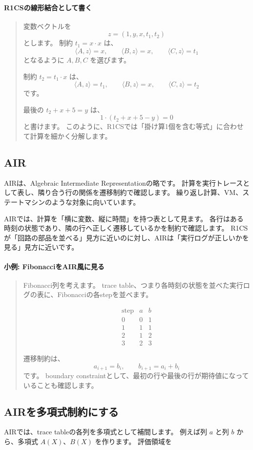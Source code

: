 \documentclass[a4paper,11pt]{ltjsarticle}
\newenvironment{examplebox}[1]{%
  \paragraph*{#1}\begin{quote}
}{%
  \end{quote}
}
\begin{document}
\begin{examplebox}{R1CSの線形結合として書く}
変数ベクトルを
\[
  z=(1,y,x,t_1,t_2)
\]
とします。
制約 \(t_1=x\cdot x\) は、
\[
  \langle A,z\rangle=x,\qquad
  \langle B,z\rangle=x,\qquad
  \langle C,z\rangle=t_1
\]
となるように \(A,B,C\) を選びます。

制約 \(t_2=t_1\cdot x\) は、
\[
  \langle A,z\rangle=t_1,\qquad
  \langle B,z\rangle=x,\qquad
  \langle C,z\rangle=t_2
\]
です。

最後の \(t_2+x+5=y\) は、
\[
  1\cdot(t_2+x+5-y)=0
\]
と書けます。
このように、R1CSでは「掛け算1個を含む等式」に合わせて計算を細かく分解します。
\end{examplebox}

\subsection{AIR}

AIRは、Algebraic Intermediate Representationの略です。
計算を実行トレースとして表し、隣り合う行の関係を遷移制約で確認します。
繰り返し計算、VM、ステートマシンのような対象に向いています。

AIRでは、計算を「横に変数、縦に時間」を持つ表として見ます。
各行はある時刻の状態であり、隣の行へ正しく遷移しているかを制約で確認します。
R1CSが「回路の部品を並べる」見方に近いのに対し、AIRは「実行ログが正しいかを見る」見方に近いです。

\begin{examplebox}{小例: FibonacciをAIR風に見る}
Fibonacci列を考えます。
trace table、つまり各時刻の状態を並べた実行ログの表に、Fibonacciの各stepを並べます。

\[
\begin{array}{c|cc}
\text{step} & a & b \\
\hline
0 & 0 & 1 \\
1 & 1 & 1 \\
2 & 1 & 2 \\
3 & 2 & 3
\end{array}
\]

遷移制約は、
\[
  a_{i+1}=b_i,\qquad b_{i+1}=a_i+b_i
\]
です。
boundary constraintとして、最初の行や最後の行が期待値になっていることも確認します。
\end{examplebox}

\subsection{AIRを多項式制約にする}

AIRでは、trace tableの各列を多項式として補間します。
例えば列 \(a\) と列 \(b\) から、多項式 \(A(X)\)、\(B(X)\) を作ります。
評価領域を
\end{document}
